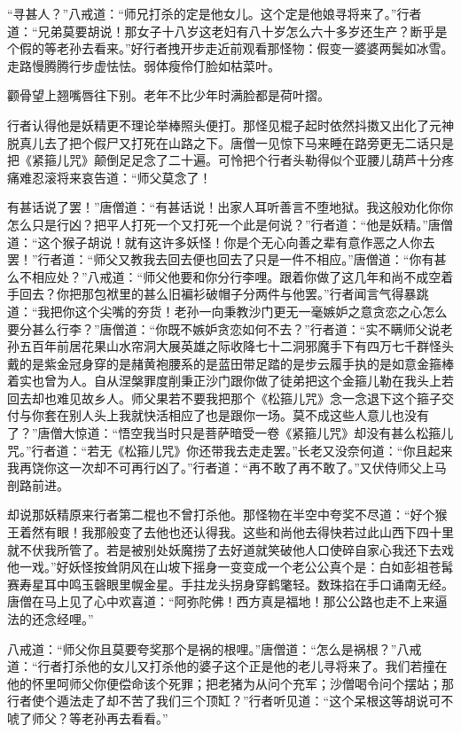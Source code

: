 \documentclass[12pt,UTF8]{ctexbook}
\begin{document}
“寻甚人？”八戒道：“师兄打杀的定是他女儿。这个定是他娘寻将来了。”行者道：“兄弟莫要胡说！那女子十八岁这老妇有八十岁怎么六十多岁还生产？断乎是个假的等老孙去看来。”好行者拽开步走近前观看那怪物：假变一婆婆两鬓如冰雪。走路慢腾腾行步虚怯怯。弱体瘦伶仃脸如枯菜叶。

颧骨望上翘嘴唇往下别。老年不比少年时满脸都是荷叶摺。

行者认得他是妖精更不理论举棒照头便打。那怪见棍子起时依然抖擞又出化了元神脱真儿去了把个假尸又打死在山路之下。唐僧一见惊下马来睡在路旁更无二话只是把《紧箍儿咒》颠倒足足念了二十遍。可怜把个行者头勒得似个亚腰儿葫芦十分疼痛难忍滚将来哀告道：“师父莫念了！

有甚话说了罢！”唐僧道：“有甚话说！出家人耳听善言不堕地狱。我这般劝化你你怎么只是行凶？把平人打死一个又打死一个此是何说？”行者道：“他是妖精。”唐僧道：“这个猴子胡说！就有这许多妖怪！你是个无心向善之辈有意作恶之人你去罢！”行者道：“师父又教我去回去便也回去了只是一件不相应。”唐僧道：“你有甚么不相应处？”八戒道：“师父他要和你分行李哩。跟着你做了这几年和尚不成空着手回去？你把那包袱里的甚么旧褊衫破帽子分两件与他罢。”行者闻言气得暴跳道：“我把你这个尖嘴的夯货！老孙一向秉教沙门更无一毫嫉妒之意贪恋之心怎么要分甚么行李？”唐僧道：“你既不嫉妒贪恋如何不去？”行者道：“实不瞒师父说老孙五百年前居花果山水帘洞大展英雄之际收降七十二洞邪魔手下有四万七千群怪头戴的是紫金冠身穿的是赭黄袍腰系的是蓝田带足踏的是步云履手执的是如意金箍棒着实也曾为人。自从涅槃罪度削秉正沙门跟你做了徒弟把这个金箍儿勒在我头上若回去却也难见故乡人。师父果若不要我把那个《松箍儿咒》念一念退下这个箍子交付与你套在别人头上我就快活相应了也是跟你一场。莫不成这些人意儿也没有了？”唐僧大惊道：“悟空我当时只是菩萨暗受一卷《紧箍儿咒》却没有甚么松箍儿咒。”行者道：“若无《松箍儿咒》你还带我去走走罢。”长老又没奈何道：“你且起来我再饶你这一次却不可再行凶了。”行者道：“再不敢了再不敢了。”又伏侍师父上马剖路前进。

却说那妖精原来行者第二棍也不曾打杀他。那怪物在半空中夸奖不尽道：“好个猴王着然有眼！我那般变了去他也还认得我。这些和尚他去得快若过此山西下四十里就不伏我所管了。若是被别处妖魔捞了去好道就笑破他人口使碎自家心我还下去戏他一戏。”好妖怪按耸阴风在山坡下摇身一变变成一个老公公真个是：白如彭祖苍髯赛寿星耳中鸣玉磬眼里幌金星。手拄龙头拐身穿鹤氅轻。数珠掐在手口诵南无经。唐僧在马上见了心中欢喜道：“阿弥陀佛！西方真是福地！那公公路也走不上来逼法的还念经哩。”

八戒道：“师父你且莫要夸奖那个是祸的根哩。”唐僧道：“怎么是祸根？”八戒道：“行者打杀他的女儿又打杀他的婆子这个正是他的老儿寻将来了。我们若撞在他的怀里呵师父你便偿命该个死罪；把老猪为从问个充军；沙僧喝令问个摆站；那行者使个遁法走了却不苦了我们三个顶缸？”行者听见道：“这个呆根这等胡说可不唬了师父？等老孙再去看看。”
\end{document}
